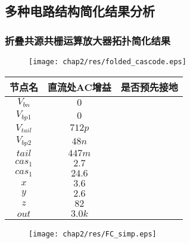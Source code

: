\subsection{多种电路结构简化结果分析}
\label{subsec:simp:res:cir}

\subsubsection{折叠共源共栅运算放大器拓扑简化结果}
\label{subsubsec:simp:res:cir:fd}

\begin{figure}[!htp]
	\centering
	\texttt{[image: chap2/res/folded\_cascode.eps]}
\end{figure}

\begin{table}[!htbp]
	\centering
	\begin{tabular}{c|c|c}
		\hline
		   节点名     & 直流处AC增益 &   是否预先接地   \\ \hline
		 $V_{bn}$  &   $0$   & \checkmark \\
		$V_{bp1}$  &   $0$   & \checkmark \\
		$V_{tail}$ & $712p$  & \checkmark \\
		$V_{bp2}$  &  $48n$  & \checkmark \\
		  $tail$   & $447m$  & \checkmark \\
		 $cas_1$   &  $2.7$  & \texttimes \\
		 $cas_1$   & $24.6$  & \texttimes \\
		   $x$     &  $3.6$  & \texttimes \\
		   $y$     &  $2.6$  & \texttimes \\
		   $z$     &  $82$   & \texttimes \\
		  $out$    & $3.0k$  & \texttimes \\ \hline
	\end{tabular}
\end{table}

\begin{figure}[!htp]
	\centering
	\texttt{[image: chap2/res/FC\_simp.eps]}
\end{figure}

